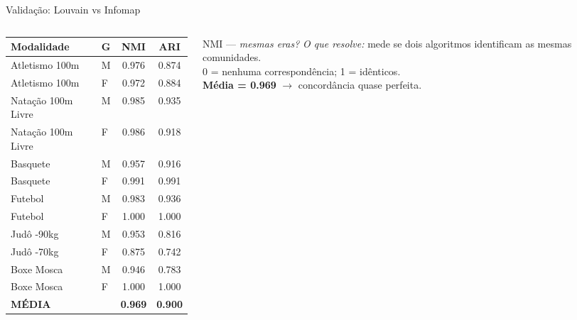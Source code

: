 \begin{frame}[shrink=12]{Validação: Louvain \cite{Blondel2008Louvain} vs Infomap \cite{Rosvall2008Infomap}}
    \begin{columns}[T]
        \begin{column}{0.58\textwidth}
            \begin{center}
            \scriptsize
            \begin{tabular}{llcc}
            \toprule
            \textbf{Modalidade} & \textbf{G} & \textbf{NMI} & \textbf{ARI} \\
            \midrule
            Atletismo 100m & M & 0.976 & 0.874 \\
            Atletismo 100m & F & 0.972 & 0.884 \\
            Natação 100m Livre & M & 0.985 & 0.935 \\
            Natação 100m Livre & F & 0.986 & 0.918 \\
            Basquete & M & 0.957 & 0.916 \\
            Basquete & F & 0.991 & 0.991 \\
            Futebol & M & 0.983 & 0.936 \\
            Futebol & F & 1.000 & 1.000 \\
            Judô -90kg & M & 0.953 & 0.816 \\
            Judô -70kg & F & 0.875 & 0.742 \\
            Boxe Mosca & M & 0.946 & 0.783 \\
            Boxe Mosca & F & 1.000 & 1.000 \\
            \midrule
            \textbf{MÉDIA} & & \textbf{0.969} & \textbf{0.900} \\
            \bottomrule
            \end{tabular}
            \end{center}
        \end{column}
        \begin{column}{0.40\textwidth}
            \begin{block}{NMI \cite{Vinh2010NMI} --- \textit{mesmas eras?}}
                \footnotesize
                \textit{O que resolve:} mede se dois algoritmos identificam as mesmas comunidades.\\
                0 = nenhuma correspondência; 1 = idênticos.\\
                \textbf{Média = 0.969} $\rightarrow$ concordância quase perfeita.
            \end{block}


\end{column}
\end{columns}
\end{frame}
